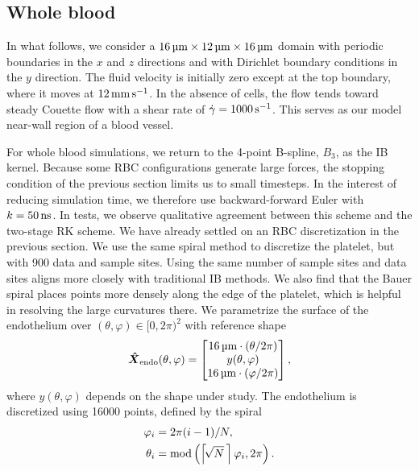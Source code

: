 \subsection{Whole blood}\label{sec:whole-blood}

In what follows, we consider a $16\um\times12\um\times16\um$ domain with periodic boundaries in the $x$ and $z$
directions and with Dirichlet boundary conditions in the $y$ direction. The fluid velocity is initially zero
except at the top boundary, where it moves at $12\mmpersec$. In the absence of cells, the flow tends toward steady
Couette flow with a shear rate of $\shear=1000\persec$. This serves as our model near-wall region of a blood
vessel.

For whole blood simulations, we return to the 4-point B-spline, $B_3$, as the IB kernel.  Because some RBC
configurations generate large forces, the stopping condition of the previous section limits us to small timesteps.
In the interest of reducing simulation time, we therefore use backward-forward Euler with $\timestep=50\ns$. In
tests, we observe qualitative agreement between this scheme and the two-stage RK scheme. We have already settled
on an RBC discretization in the previous section. We use the same spiral method to discretize the platelet, but
with 900 data and sample sites. Using the same number of sample sites and data sites aligns more closely with
traditional IB methods. We also find that the Bauer spiral places points more densely along the edge of the
platelet, which is helpful in resolving the large curvatures there. We parametrize the surface of the endothelium
over $(\theta, \varphi)\in{[0, 2\pi)}^2$ with reference shape
\begin{equation}
    \vec{\hat{X}}_\text{endo}(\theta, \varphi) = \begin{bmatrix}
            16\um\cdot(\theta/2\pi)  \\
            y(\theta, \varphi) \\
            16\um\cdot(\varphi/2\pi)
    \end{bmatrix},
\end{equation}
where $y(\theta, \varphi)$ depends on the shape under study. The endothelium is discretized using 16000 points,
defined by the spiral
\begin{equation}
    \begin{aligned}
    \varphi_i &= 2\pi (i-1)/N, \\
    \theta_i &= \modulo\left(\left\lceil\!\sqrt{N}\mskip\thinmuskip\right\rceil\varphi_i, 2\pi\right).
    \end{aligned}
\end{equation}
